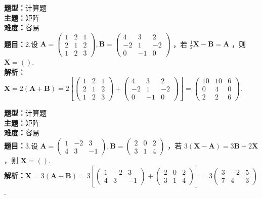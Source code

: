 \documentclass{ctexart}
\newenvironment{question}[5]{%
	\noindent\textbf{题型：}#1\\
	\textbf{主题：}#2\\
	\textbf{难度：}#3\\
	\textbf{题目：}#4\\
	\textbf{解析：}#5\\
	\vspace{1em}
}{}
\begin{document}
	\begin{question}
		{计算题}
		{矩阵}
		{容易}
		{2.设 \(\mathbf{A}=\left(\begin{array}{lll}1 & 2 & 1 \\ 2 & 1 & 2 \\ 1 & 2 & 3\end{array}\right), \mathbf{B}=\left(\begin{array}{ccc}4 & 3 & 2 \\ -2 & 1 & -2 \\ 0 & -1 & 0\end{array}\right)\) ，若 \(\frac{1}{2} \mathbf{X}-\mathbf{B}=\mathbf{A}\) ，则 \(\mathbf{X}=()\).}
		{\(\mathbf{X}=2(\mathbf{A}+\mathbf{B})=2\left[\left(\begin{array}{ccc}1 & 2 & 1 \\ 2 & 1 & 2 \\ 1 & 2 & 3\end{array}\right)+\left(\begin{array}{ccc}4 & 3 & 2 \\ -2 & 1 & -2 \\ 0 & -1 & 0\end{array}\right)\right]=\left(\begin{array}{ccc}10 & 10 & 6 \\ 0 & 4 & 0 \\ 2 & 2 & 6\end{array}\right)\).}
	\end{question}
	
	\begin{question}
		{计算题}
		{矩阵}
		{容易}
		{3.设 \(\mathbf{A}=\left(\begin{array}{ccc}1 & -2 & 3 \\ 4 & 3 & -1\end{array}\right), \mathbf{B}=\left(\begin{array}{ccc}2 & 0 & 2 \\ 3 & 1 & 4\end{array}\right)\) ，若 \(3(\mathbf{X}-\mathbf{A})=3 \mathbf{B}+2 \mathbf{X}\) ，则 \(\mathbf{X}=()\).}
		{\(\mathbf{X}=3(\mathbf{A}+\mathbf{B})=3\left[\left(\begin{array}{ccc}1 & -2 & 3 \\ 4 & 3 & -1\end{array}\right)+\left(\begin{array}{ccc}2 & 0 & 2 \\ 3 & 1 & 4\end{array}\right)\right]=3\left(\begin{array}{ccc}3 & -2 & 5 \\ 7 & 4 & 3\end{array}\right)\).}
	\end{question}
	
\end{document}
